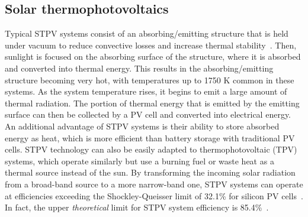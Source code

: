 \documentclass[10pt,letterpaper]{article}
\begin{document}
{\subsection{Solar thermophotovoltaics}
Typical STPV systems consist of an absorbing/emitting structure that is held under vacuum to reduce convective losses and increase thermal stability~\cite{global_opt, convection}.  Then, sunlight is focused on the absorbing surface of the structure, where it is absorbed and converted into thermal energy.  This results in the absorbing/emitting structure becoming very hot, with temperatures up to 1750 K common in these systems.  As the system temperature rises, it begins to emit a large amount of thermal radiation.  The portion of thermal energy that is emitted by the emitting surface can then be collected by a PV cell and converted into electrical energy.  An additional advantage of STPV systems is their ability to store absorbed energy as heat, which is more efficient than battery storage with traditional PV cells.  STPV technology can also be easily adapted to thermophotovoltaic (TPV) systems, which operate similarly but use a burning fuel or waste heat as a thermal source instead of the sun.  By transforming the incoming solar radiation from a broad-band source to a more narrow-band one, STPV systems can operate at efficiencies exceeding the Shockley-Queisser limit of 32.1\% for silicon PV cells~\cite{SQ}.  In fact, the upper {\it theoretical} limit for STPV system efficiency is 85.4\%~\cite{A2}.

}
\end{document}
